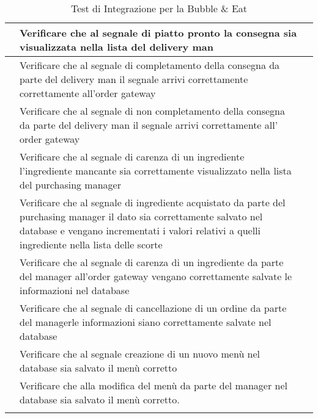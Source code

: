 \begin{longtable}{|c|P{9cm}|c|}
	\hline {} & Verificare che al segnale di piatto pronto la consegna sia visualizzata nella lista del delivery man &  \\
	\hline {} & Verificare che al segnale di completamento della consegna da parte del delivery man il segnale arrivi correttamente correttamente all’order gateway &  \\
	\hline {} & Verificare che al segnale di non completamento della consegna da parte del delivery man il segnale arrivi correttamente all’ order gateway &  \\
	\hline {} & Verificare che al segnale di carenza di un ingrediente  l'ingrediente mancante sia correttamente visualizzato nella lista del purchasing manager &  \\
	\hline {} & Verificare che al segnale di ingrediente acquistato da parte del purchasing manager il dato sia correttamente salvato nel database e vengano incrementati i valori relativi a quelli ingrediente nella lista delle scorte  &  \\
	
	\hline {} & Verificare che al segnale di carenza di un ingrediente da parte del manager all'order gateway vengano correttamente salvate le informazioni nel database  &  \\
	\hline {} & Verificare che al segnale di cancellazione di un ordine da parte del managerle informazioni siano correttamente salvate nel database  &  \\
	\hline {} & Verificare che al  segnale creazione di un nuovo menù nel database sia salvato il menù corretto  &  \\
	\hline {} & Verificare che alla modifica del menù da parte del manager nel database sia salvato il menù corretto. &  \\
	\hline
	\caption{Test di Integrazione per la Bubble \& Eat}
\end{longtable}